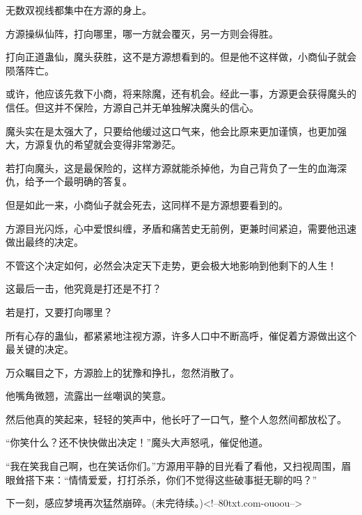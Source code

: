 \begin{this_body}
无数双视线都集中在方源的身上。

方源操纵仙阵，打向哪里，哪一方就会覆灭，另一方则会得胜。

打向正道蛊仙，魔头获胜，这不是方源想看到的。但是他不这样做，小商仙子就会陨落阵亡。

或许，他应该先救下小商，将来除魔，还有机会。经此一事，方源更会获得魔头的信任。但这并不保险，方源自己并无单独解决魔头的信心。

魔头实在是太强大了，只要给他缓过这口气来，他会比原来更加谨慎，也更加强大，方源复仇的希望就会变得非常渺茫。

若打向魔头，这是最保险的，这样方源就能杀掉他，为自己背负了一生的血海深仇，给予一个最明确的答复。

但是如此一来，小商仙子就会死去，这同样不是方源想要看到的。

方源目光闪烁，心中爱恨纠缠，矛盾和痛苦史无前例，更兼时间紧迫，需要他迅速做出最终的决定。

不管这个决定如何，必然会决定天下走势，更会极大地影响到他剩下的人生！

这最后一击，他究竟是打还是不打？

若是打，又要打向哪里？

所有心存的蛊仙，都紧紧地注视方源，许多人口中不断高呼，催促着方源做出这个最关键的决定。

万众瞩目之下，方源脸上的犹豫和挣扎，忽然消散了。

他嘴角微翘，流露出一丝嘲讽的笑意。

然后他真的笑起来，轻轻的笑声中，他长吁了一口气，整个人忽然间都放松了。

“你笑什么？还不快快做出决定！”魔头大声怒吼，催促他道。

“我在笑我自己啊，也在笑话你们。”方源用平静的目光看了看他，又扫视周围，眉眼耸搭下来：“情情爱爱，打打杀杀，你们不觉得这些破事挺无聊的吗？”

下一刻，感应梦境再次猛然崩碎。(未完待续。)<!--80txt.com-ouoou-->

\end{this_body}

